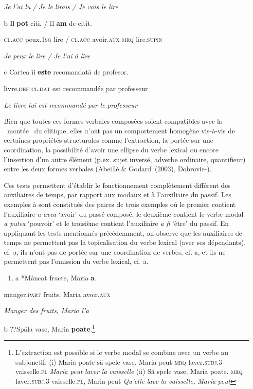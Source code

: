     \textit{Je l'ai lu / Je le lirais / Je vais le lire}   

  b  Il     \textbf{pot}     citi. / Il    \textbf{am}    de  citit.

    \textsc{cl.acc} peux.\textsc{1sg} lire / \textsc{cl.acc} avoir.\textsc{aux  mrq} lire.\textsc{supin}

    \textit{Je peux le lire / Je l'ai à lire}

  c  Cartea  îi     \textbf{este} recomandată  de  profesor.

    livre.\textsc{def cl.dat} est  recommandée par professeur

    \textit{Le livre lui est recommandé par le professeur}

Bien que toutes ces formes verbales composées soient compatibles avec la {\guillemotleft}~montée~{\guillemotright} du clitique, elles n'ont pas un comportement homogène vis-à-vis de certaines propriétés structurales comme l'extraction, la portée sur une coordination, la possibilité d'avoir une ellipse du verbe lexical ou encore l'insertion d'un autre élément (p.ex. sujet inversé, adverbe ordinaire, quantifieur) entre les deux formes verbales (Abeillé \& Godard~(2003), Dobrovie-\citet{Sorin1994}).

Ces tests permettent d'établir le fonctionnement complètement différent des auxiliaires de temps, par rapport aux modaux et à l'auxiliaire du passif. Les exemples  à  sont constitués des paires de trois exemples où le premier contient l'auxiliaire \textit{a avea} `avoir' du passé composé, le deuxième contient le verbe modal \textit{a putea} `pouvoir' et le troisième contient l'auxiliaire \textit{a fi} `être' du passif. En appliquant les tests mentionnés précédemment, on observe que les auxiliaires de temps ne permettent pas la topicalisation du verbe lexical (avec ses dépendants), cf. a, ils n'ont pas de portée sur une coordination de verbes, cf. a, et ils ne permettent pas l'omission du verbe lexical, cf. a.


\begin{enumerate}
\item \label{bkm:Ref277002017}a  *Mâncat  fructe,  Maria  \textbf{a}.


\end{enumerate}
manger.\textsc{part } fruits,  Maria  avoir.\textsc{aux}

    \textit{Manger des fruits, Maria l'a}   

  b  ??Spăla  vase,  Maria  \textbf{poate}.\footnote{L'extraction est possible si le verbe modal se combine avec un verbe au subjonctif. 
(i)  Maria  poate  să  spele  vase.
  Maria  peut  \textsc{mrq } laver.\textsc{subj.3}  vaisselle.\textsc{pl}
  \textit{Maria peut laver la vaisselle}
(ii)  Să  spele  vase,  Maria  poate.
  \textsc{mrq } laver.\textsc{subj.3}  vaisselle.\textsc{pl},  Maria  peut
  \textit{Qu'elle lave la vaisselle, Maria peut}}

